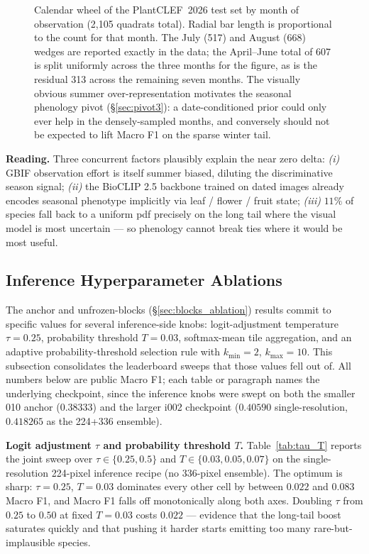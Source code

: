 \documentclass[sigconf]{ceurart}
\begin{document}
\begin{figure}[!htbp]
  \centering
  \resizebox{0.82\linewidth}{!}{}
  \caption{Calendar wheel of the PlantCLEF~2026 test set by month of observation (2{,}105 quadrats total). Radial bar length is proportional to the count for that month. The July (517) and August (668) wedges are reported exactly in the data; the April--June total of 607 is split uniformly across the three months for the figure, as is the residual 313 across the remaining seven months. The visually obvious summer over-representation motivates the seasonal phenology pivot (\S\ref{sec:pivot3}): a date-conditioned prior could only ever help in the densely-sampled months, and conversely should not be expected to lift Macro F1 on the sparse winter tail.}
  \label{fig:test_doy_wheel}
\end{figure}
\textbf{Reading.} Three concurrent factors plausibly explain the near zero delta: \textit{(i)} GBIF observation effort is itself summer biased, diluting the discriminative season signal; \textit{(ii)} the BioCLIP 2.5 backbone trained on dated images already encodes seasonal phenotype implicitly via leaf / flower / fruit state; \textit{(iii)} $11\%$ of species fall back to a uniform pdf precisely on the long tail where the visual model is most uncertain --- so phenology cannot break ties where it would be most useful.
\subsection{Inference Hyperparameter Ablations}
\label{sec:infer_ablations}
The anchor and unfrozen-blocks (\S\ref{sec:blocks_ablation}) results commit to specific values for several inference-side knobs: logit-adjustment temperature $\tau{=}0.25$, probability threshold $T{=}0.03$, softmax-mean tile aggregation, and an adaptive probability-threshold selection rule with $k_{\min}{=}2$, $k_{\max}{=}10$. This subsection consolidates the leaderboard sweeps that those values fell out of. All numbers below are public Macro F1; each table or paragraph names the underlying checkpoint, since the inference knobs were swept on both the smaller 010 anchor ($0.38333$) and the larger i002 checkpoint ($0.40590$ single-resolution, $0.418265$ as the 224+336 ensemble).

\textbf{Logit adjustment $\tau$ and probability threshold $T$.} Table~\ref{tab:tau_T} reports the joint sweep over $\tau \in \{0.25, 0.5\}$ and $T \in \{0.03, 0.05, 0.07\}$ on the single-resolution 224-pixel inference recipe (no 336-pixel ensemble). The optimum is sharp: $\tau{=}0.25$, $T{=}0.03$ dominates every other cell by between $0.022$ and $0.083$ Macro F1, and Macro F1 falls off monotonically along both axes. Doubling $\tau$ from $0.25$ to $0.50$ at fixed $T{=}0.03$ costs $0.022$ --- evidence that the long-tail boost saturates quickly and that pushing it harder starts emitting too many rare-but-implausible species.
\end{document}
